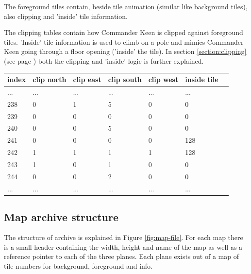 \documentclass[book.tex]{subfiles}
\begin{document}
  \par
The foreground tiles contain, beside tile animation (similar like background tiles), also clipping and 'inside' tile information.\\
\par
The clipping tables contain how Commander Keen is clipped against foreground tiles. 'Inside' tile information is used to climb on a pole and mimics Commander Keen going through a floor opening ('inside' the tile). In section \ref{section:clipping} (see page \pageref{section:clipping}) both the clipping and 'inside' logic is further explained.\\
\begin{table}[H]
  \begin{tabularx}{\textwidth}[c]{XXXXXXX}
  \hline
  \textbf{index} & \textbf{clip north} & \textbf{clip east} & \textbf{clip south} & \textbf{clip west}  & \textbf{inside tile} \\ \hline
  ...    & ...     & ...    & ...   & ...     & ...      \\
  238    & 0       & 1      & 5     & 0       & 0        \\
  239    & 0       & 0      & 0     & 0       & 0        \\
  240    & 0       & 0      & 5     & 0       & 0        \\
  241    & 0       & 0      & 0     & 0       & 128       \\
  242    & 1       & 1      & 1     & 1       & 128       \\
  243    & 1       & 0      & 1     & 0       & 0       \\
  244    & 0       & 0      & 2     & 0       & 0       \\
  ...    & ...     & ...    & ...   & ...     & ...     \\
  \end{tabularx}
  \end{table}


\pagebreak
 
\subsection{Map archive structure}
The structure of  archive is explained in Figure \ref{fig:map-file}. For each map there is a small header containing the width, height and name of the map as well as a reference pointer to each of the three planes. Each plane exists out of a map of tile numbers for background, foreground and info.\\
\end{document}
